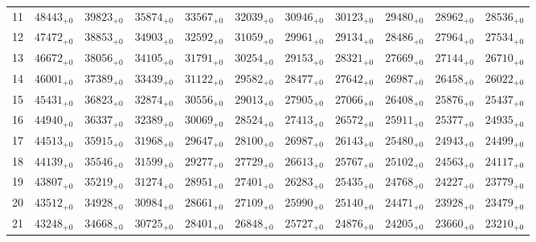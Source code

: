 \documentclass[10pt, a4paper]{article}
\begin{document}
\begin{center}
\begin{tabular}{c || c c c c c | c c c c c}
        \hline
        11 & \({48443}_{+0}\) & \({39823}_{+0}\) & \({35874}_{+0}\) & \({33567}_{+0}\) & \({32039}_{+0}\) & \({30946}_{+0}\) & \({30123}_{+0}\) & \({29480}_{+0}\) & \({28962}_{+0}\) & \({28536}_{+0}\)\\
        12 & \({47472}_{+0}\) & \({38853}_{+0}\) & \({34903}_{+0}\) & \({32592}_{+0}\) & \({31059}_{+0}\) & \({29961}_{+0}\) & \({29134}_{+0}\) & \({28486}_{+0}\) & \({27964}_{+0}\) & \({27534}_{+0}\)\\
        13 & \({46672}_{+0}\) & \({38056}_{+0}\) & \({34105}_{+0}\) & \({31791}_{+0}\) & \({30254}_{+0}\) & \({29153}_{+0}\) & \({28321}_{+0}\) & \({27669}_{+0}\) & \({27144}_{+0}\) & \({26710}_{+0}\)\\
        14 & \({46001}_{+0}\) & \({37389}_{+0}\) & \({33439}_{+0}\) & \({31122}_{+0}\) & \({29582}_{+0}\) & \({28477}_{+0}\) & \({27642}_{+0}\) & \({26987}_{+0}\) & \({26458}_{+0}\) & \({26022}_{+0}\)\\
        15 & \({45431}_{+0}\) & \({36823}_{+0}\) & \({32874}_{+0}\) & \({30556}_{+0}\) & \({29013}_{+0}\) & \({27905}_{+0}\) & \({27066}_{+0}\) & \({26408}_{+0}\) & \({25876}_{+0}\) & \({25437}_{+0}\)\\
        \hline
        16 & \({44940}_{+0}\) & \({36337}_{+0}\) & \({32389}_{+0}\) & \({30069}_{+0}\) & \({28524}_{+0}\) & \({27413}_{+0}\) & \({26572}_{+0}\) & \({25911}_{+0}\) & \({25377}_{+0}\) & \({24935}_{+0}\)\\
        17 & \({44513}_{+0}\) & \({35915}_{+0}\) & \({31968}_{+0}\) & \({29647}_{+0}\) & \({28100}_{+0}\) & \({26987}_{+0}\) & \({26143}_{+0}\) & \({25480}_{+0}\) & \({24943}_{+0}\) & \({24499}_{+0}\)\\
        18 & \({44139}_{+0}\) & \({35546}_{+0}\) & \({31599}_{+0}\) & \({29277}_{+0}\) & \({27729}_{+0}\) & \({26613}_{+0}\) & \({25767}_{+0}\) & \({25102}_{+0}\) & \({24563}_{+0}\) & \({24117}_{+0}\)\\
        19 & \({43807}_{+0}\) & \({35219}_{+0}\) & \({31274}_{+0}\) & \({28951}_{+0}\) & \({27401}_{+0}\) & \({26283}_{+0}\) & \({25435}_{+0}\) & \({24768}_{+0}\) & \({24227}_{+0}\) & \({23779}_{+0}\)\\
        20 & \({43512}_{+0}\) & \({34928}_{+0}\) & \({30984}_{+0}\) & \({28661}_{+0}\) & \({27109}_{+0}\) & \({25990}_{+0}\) & \({25140}_{+0}\) & \({24471}_{+0}\) & \({23928}_{+0}\) & \({23479}_{+0}\)\\
        \hline
        21 & \({43248}_{+0}\) & \({34668}_{+0}\) & \({30725}_{+0}\) & \({28401}_{+0}\) & \({26848}_{+0}\) & \({25727}_{+0}\) & \({24876}_{+0}\) & \({24205}_{+0}\) & \({23660}_{+0}\) & \({23210}_{+0}\)\\

\end{tabular}
\end{center}
\end{document}
